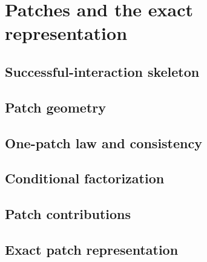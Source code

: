 \section{Patches and the exact representation}
\label{sec:patches}
\label{sec:representation}

\subsection{Successful-interaction skeleton}

\subsection{Patch geometry}

\subsection{One-patch law and consistency}

\subsection{Conditional factorization}

\subsection{Patch contributions}

\subsection{Exact patch representation}
